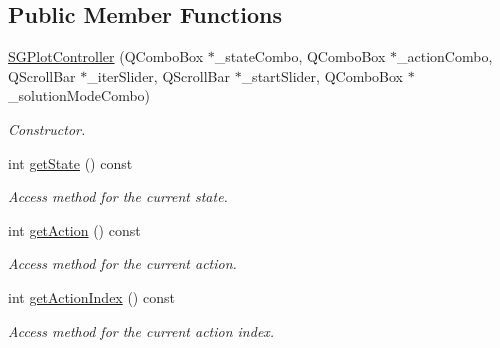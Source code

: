 \subsection*{Public Member Functions}
\begin{DoxyCompactItemize}
\item 
\mbox{\label{classSGPlotController_ac69ac7f2655141d6ed05b30216066885}} 
\hyperlink{classSGPlotController_ac69ac7f2655141d6ed05b30216066885}{S\+G\+Plot\+Controller} (Q\+Combo\+Box $\ast$\+\_\+state\+Combo, Q\+Combo\+Box $\ast$\+\_\+action\+Combo, Q\+Scroll\+Bar $\ast$\+\_\+iter\+Slider, Q\+Scroll\+Bar $\ast$\+\_\+start\+Slider, Q\+Combo\+Box $\ast$\+\_\+solution\+Mode\+Combo)
\begin{DoxyCompactList}\small\item\em Constructor. \end{DoxyCompactList}\item 
\mbox{\label{classSGPlotController_af4d02a19c7a3a29959f2c7e02826831e}} 
int \hyperlink{classSGPlotController_af4d02a19c7a3a29959f2c7e02826831e}{get\+State} () const
\begin{DoxyCompactList}\small\item\em Access method for the current state. \end{DoxyCompactList}\item 
\mbox{\label{classSGPlotController_ab80599d82f9d4823c376c52f845e7f6e}} 
int \hyperlink{classSGPlotController_ab80599d82f9d4823c376c52f845e7f6e}{get\+Action} () const
\begin{DoxyCompactList}\small\item\em Access method for the current action. \end{DoxyCompactList}\item 
\mbox{\label{classSGPlotController_a7981d2ad2ce8c37a0acf8d0855a309c8}} 
int \hyperlink{classSGPlotController_a7981d2ad2ce8c37a0acf8d0855a309c8}{get\+Action\+Index} () const
\begin{DoxyCompactList}\small\item\em Access method for the current action index. \end{DoxyCompactList}\item 
\mbox{\label{classSGPlotController_a3feedf398c637ccc61da156098c97f5c}} 

\end{DoxyCompactItemize}
